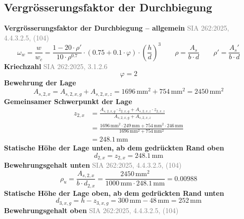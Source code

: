 \documentclass[11pt,a4paper]{article}
\newcommand{\normref}[1]{{\small\textcolor{gray}{#1}}}
\begin{document}
\subsection{Vergrösserungsfaktor der Durchbiegung}
\noindent\textbf{Vergrösserungsfaktor der Durchbiegung – allgemein} \hfill \normref{SIA 262:2025, 4.4.3.2.5, (104)}
\begin{equation*}
\omega_w = \frac{w}{w_c} = \frac{1 - 20 \cdot \rho'}{10 \cdot \rho^{0.7}} \cdot \left(0.75 + 0.1 \cdot \varphi\right) \cdot \left(\frac{h}{d}\right)^{3} \qquad \rho = \frac{A_s}{b \cdot d} \qquad \rho' = \frac{A_s'}{b \cdot d}
\end{equation*}
\noindent\textbf{Kriechzahl} \hfill \normref{SIA 262:2025, 3.1.2.6}
\begin{equation*}
\varphi = 2
\end{equation*}
\noindent\textbf{Bewehrung der Lage}
\begin{equation*}
A_{s,2,x} = A_{s,2,x,g} + A_{s,2,x,z} = 1696\,\mathrm{mm}^{2} + 754\,\mathrm{mm}^{2} = 2450\,\mathrm{mm}^{2}
\end{equation*}
\noindent\textbf{Gemeinsamer Schwerpunkt der Lage}
\begin{equation*}
\begin{aligned}
  z_{2,x} &= \frac{A_{s,2,x,g} \cdot z_{2,x,g} + A_{s,2,x,z} \cdot z_{2,x,z}}{A_{s,2,x,g} + A_{s,2,x,z}} \\
  &= \frac{1696\,\mathrm{mm}^{2} \cdot 249\,\mathrm{mm} + 754\,\mathrm{mm}^{2} \cdot 246\,\mathrm{mm}}{1696\,\mathrm{mm}^{2} + 754\,\mathrm{mm}^{2}} \\
  &= 248.1\,\mathrm{mm}
\end{aligned}
\end{equation*}
\noindent\textbf{Statische Höhe der Lage unten, ab dem gedrückten Rand oben}
\begin{equation*}
d_{2,x} = z_{2,x} = 248.1\,\mathrm{mm}
\end{equation*}
\noindent\textbf{Bewehrungsgehalt unten} \hfill \normref{SIA 262:2025, 4.4.3.2.5, (104)}
\begin{equation*}
\rho_{u} = \frac{A_{s,2,x}}{b \cdot d_{2,x}} = \frac{2450\,\mathrm{mm}^{2}}{1000\,\mathrm{mm} \cdot 248.1\,\mathrm{mm}} = 0.00988
\end{equation*}
\noindent\textbf{Statische Höhe der Lage oben, ab dem gedrückten Rand unten}
\begin{equation*}
d_{3,x,g} = h - z_{3,x,g} = 300\,\mathrm{mm} - 48\,\mathrm{mm} = 252\,\mathrm{mm}
\end{equation*}
\noindent\textbf{Bewehrungsgehalt oben} \hfill \normref{SIA 262:2025, 4.4.3.2.5, (104)}
\end{document}
